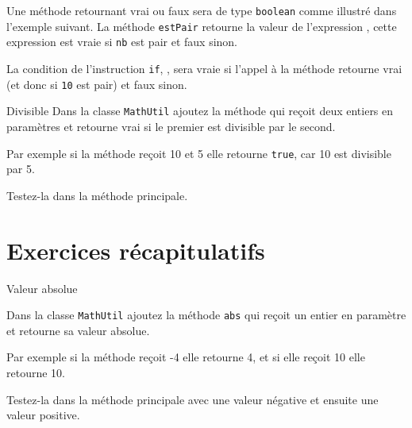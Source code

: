 \documentclass[a4paper,11pt]{article}
\begin{document}
	Une méthode retournant vrai ou faux sera de type \texttt{boolean} comme illustré dans l'exemple suivant.
	La méthode \texttt{estPair} retourne la valeur de l'expression , 
	cette expression est vraie si \texttt{nb} est pair et faux sinon.
	
	La condition de l'instruction \texttt{if}, , sera vraie si l'appel à la méthode retourne vrai (et donc si \texttt{10} est pair)
	 et faux sinon.

	 \begin{Exercice}{Divisible}
		Dans la classe \texttt{MathUtil} ajoutez la méthode 
		 qui reçoit deux entiers en paramètres et 
		retourne vrai si le premier est divisible par le second.
		
		Par exemple si la méthode reçoit 10 et 5 elle retourne \texttt{true}, car 10 est divisible par 5.
		
		Testez-la dans la méthode principale.
	\end{Exercice} 

%		
%		
%	
%				

	
\section{Exercices récapitulatifs}
				
	 \begin{Exercice}{Valeur absolue}
		
		Dans la classe \texttt{MathUtil} ajoutez la méthode 
		\texttt{abs} qui reçoit un entier en paramètre et retourne sa valeur absolue.
		
		Par exemple si la méthode reçoit -4 elle retourne 4, et si elle reçoit 10 elle retourne 10.
		
		Testez-la dans la méthode principale avec une valeur négative et ensuite une valeur positive.
		
	\end{Exercice} 
					
\end{document}
